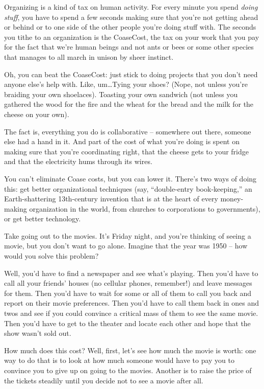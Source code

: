 Organizing is a kind of tax on human activity. For every minute you
spend \emph{doing stuff}, you have to spend a few seconds making
sure that you're not getting ahead or behind or to one side of the
other people you're doing stuff with. The seconds you tithe to an
organization is the CoaseCost, the tax on your work that you pay
for the fact that we're human beings and not ants or bees or some
other species that manages to all march in unison by sheer
instinct.

Oh, you can beat the CoaseCost: just stick to doing projects that
you don't need anyone else's help with. Like, um\ldots{}Tying your
shoes? (Nope, not unless you're braiding your own shoelaces).
Toasting your own sandwich (not unless you gathered the wood for
the fire and the wheat for the bread and the milk for the cheese on
your own).

The fact is, everything you do is collaborative -- somewhere out
there, someone else had a hand in it. And part of the cost of what
you're doing is spent on making sure that you're coordinating
right, that the cheese gets to your fridge and that the electricity
hums through its wires.

You can't eliminate Coase costs, but you can lower it. There's two
ways of doing this: get better organizational techniques (say,
``double-entry book-keeping,'' an Earth-shattering 13th-century
invention that is at the heart of every money-making organization
in the world, from churches to corporations to governments), or get
better technology.

Take going out to the movies. It's Friday night, and you're
thinking of seeing a movie, but you don't want to go alone. Imagine
that the year was 1950 -- how would you solve this problem?

Well, you'd have to find a newspaper and see what's playing. Then
you'd have to call all your friends' houses (no cellular phones,
remember!) and leave messages for them. Then you'd have to wait for
some or all of them to call you back and report on their movie
preferences. Then you'd have to call them back in ones and twos and
see if you could convince a critical mass of them to see the same
movie. Then you'd have to get to the theater and locate each other
and hope that the show wasn't sold out.

How much does this cost? Well, first, let's see how much the movie
is worth: one way to do that is to look at how much someone would
have to pay you to convince you to give up on going to the movies.
Another is to raise the price of the tickets steadily until you
decide not to see a movie after all.

